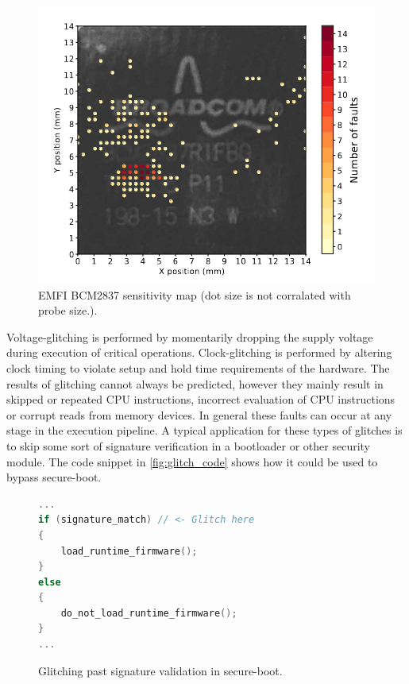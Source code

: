 \begin{figure}[h!]
    \centering
    \includegraphics[scale=0.5]{docs/images/emfi_error_map.png}
    \caption{EMFI BCM2837 sensitivity map (dot size is not corralated with probe size.)\cite{emfi_injection}.}
    \label{fig:emfi_map}
\end{figure}

Voltage-glitching is performed by momentarily dropping the supply voltage during execution of critical operations. Clock-glitching is performed by altering clock timing to violate setup and hold time requirements of the hardware\cite{intro_to_FI}. The results of glitching cannot always be predicted, however they mainly result in skipped or repeated CPU instructions, incorrect evaluation of CPU instructions or corrupt reads from memory devices\cite{intro_to_FI}. In general these faults can occur at any stage in the execution pipeline. A typical application for these types of glitches is to skip some sort of signature verification in a bootloader or other security module. The code snippet in \autoref{fig:glitch_code} shows how it could be used to bypass secure-boot.

\begin{figure}
\begin{lstlisting}[language=C]
...
if (signature_match) // <- Glitch here
{
    load_runtime_firmware();
}
else 
{
    do_not_load_runtime_firmware();
}
...
\end{lstlisting}
\caption{Glitching past signature validation in secure-boot.}
\label{fig:glitch_code}
\end{figure}


